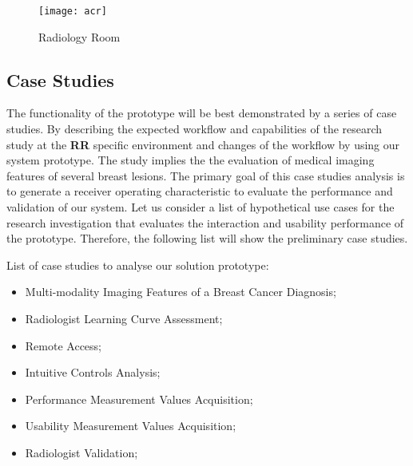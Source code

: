 
\hfill

\begin{figure}[h]
\centering
\texttt{[image: acr]}
\caption{Radiology Room}
\label{fig:radioroom}
\end{figure}

\hfill



\subsection{Case Studies}

The functionality of the prototype will be best demonstrated by a series of case studies. By describing the expected workflow and capabilities of the research study at the \textbf{RR} specific environment and changes of the workflow by using our system prototype. The study implies the the evaluation of medical imaging features of several breast lesions. The primary goal of this case studies analysis is to generate a receiver operating characteristic to evaluate the performance and validation of our system. Let us consider a list of hypothetical use cases for the research investigation that evaluates the interaction and usability performance of the prototype. Therefore, the following list will show the preliminary case studies.

\hfill

List of case studies to analyse our solution prototype:

\hfill

\begin{itemize}
  \item Multi-modality Imaging Features of a Breast Cancer Diagnosis;
  \item Radiologist Learning Curve Assessment;
  \item Remote Access;
  \item Intuitive Controls Analysis;
  \item Performance Measurement Values Acquisition;
  \item Usability Measurement Values Acquisition;
  \item Radiologist Validation;
\end{itemize}

